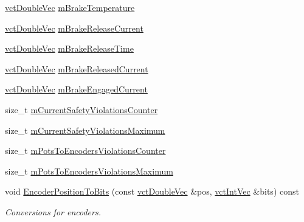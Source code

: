 \begin{DoxyCompactItemize}
\item 
\hyperlink{vct_dynamic_vector_types_8h_ade4b3068c86fb88f41af2e5187e491c2}{vct\-Double\-Vec} \hyperlink{classsaw_robot_i_o1394_1_1osa_robot1394_afc8bcc9aec7faac8040ade02c31be22e}{m\-Brake\-Temperature}
\item 
\hyperlink{vct_dynamic_vector_types_8h_ade4b3068c86fb88f41af2e5187e491c2}{vct\-Double\-Vec} \hyperlink{classsaw_robot_i_o1394_1_1osa_robot1394_aff3f31f6f71d5e028172058b89c6eb5a}{m\-Brake\-Release\-Current}
\item 
\hyperlink{vct_dynamic_vector_types_8h_ade4b3068c86fb88f41af2e5187e491c2}{vct\-Double\-Vec} \hyperlink{classsaw_robot_i_o1394_1_1osa_robot1394_a228ae3a31f376f2d1ece0c57b787cd0c}{m\-Brake\-Release\-Time}
\item 
\hyperlink{vct_dynamic_vector_types_8h_ade4b3068c86fb88f41af2e5187e491c2}{vct\-Double\-Vec} \hyperlink{classsaw_robot_i_o1394_1_1osa_robot1394_a28987e1bf7db987c6bfe64897b1f17af}{m\-Brake\-Released\-Current}
\item 
\hyperlink{vct_dynamic_vector_types_8h_ade4b3068c86fb88f41af2e5187e491c2}{vct\-Double\-Vec} \hyperlink{classsaw_robot_i_o1394_1_1osa_robot1394_a750756adaca4166dd9874daee0dea864}{m\-Brake\-Engaged\-Current}
\item 
size\-\_\-t \hyperlink{classsaw_robot_i_o1394_1_1osa_robot1394_a31a6983af09293393bb7b15df2c26b6f}{m\-Current\-Safety\-Violations\-Counter}
\item 
size\-\_\-t \hyperlink{classsaw_robot_i_o1394_1_1osa_robot1394_a5cbb3eae608f0e374289f215c038ae24}{m\-Current\-Safety\-Violations\-Maximum}
\item 
size\-\_\-t \hyperlink{classsaw_robot_i_o1394_1_1osa_robot1394_ad747763f7554549a4017cc16ed1b5f9d}{m\-Pots\-To\-Encoders\-Violations\-Counter}
\item 
size\-\_\-t \hyperlink{classsaw_robot_i_o1394_1_1osa_robot1394_adae503dee9fa53e3a6eb7b9083d810fa}{m\-Pots\-To\-Encoders\-Violations\-Maximum}
\item 
void \hyperlink{classsaw_robot_i_o1394_1_1osa_robot1394_aff09b06efab375206419d63342222ba6}{Encoder\-Position\-To\-Bits} (const \hyperlink{vct_dynamic_vector_types_8h_ade4b3068c86fb88f41af2e5187e491c2}{vct\-Double\-Vec} \&pos, \hyperlink{vct_dynamic_vector_types_8h_a47260df0b570a25352b3f318ed0b4c4e}{vct\-Int\-Vec} \&bits) const 
\begin{DoxyCompactList}\small\item\em Conversions for encoders. \end{DoxyCompactList}\item 

\end{DoxyCompactItemize}
